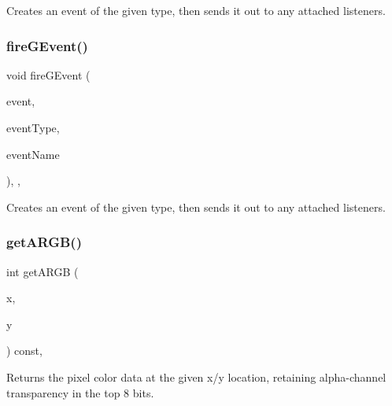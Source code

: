 Creates an event of the given type, then sends it out to any attached listeners. 

\mbox{\label{classsgl_1_1GObservable_a2a70a7d7435ff0c3b80bb4d70da19e0d}} 
\subsubsection{\texorpdfstring{fire\+G\+Event()}{fireGEvent()}\hspace{0.1cm}{\footnotesize\ttfamily [8/8]}}
{\footnotesize\ttfamily void fire\+G\+Event (\begin{DoxyParamCaption}\item[{Q\+Window\+State\+Change\+Event $\ast$}]{event,  }\item[{\mbox{\hyperlink{namespacesgl_a2628ea8d12e8b2563c32f05dc7fff6fa}{Event\+Type}}}]{event\+Type,  }\item[{const std\+::string \&}]{event\+Name }\end{DoxyParamCaption})\hspace{0.3cm}{\ttfamily [protected]}, {\ttfamily [virtual]}, {\ttfamily [inherited]}}



Creates an event of the given type, then sends it out to any attached listeners. 

\mbox{\label{classsgl_1_1GDrawingSurface_ae394d39f20476570e083918d991c25bd}} 
\subsubsection{\texorpdfstring{get\+A\+R\+G\+B()}{getARGB()}}
{\footnotesize\ttfamily int get\+A\+R\+GB (\begin{DoxyParamCaption}\item[{double}]{x,  }\item[{double}]{y }\end{DoxyParamCaption}) const\hspace{0.3cm}{\ttfamily [virtual]}, {\ttfamily [inherited]}}



Returns the pixel color data at the given x/y location, retaining alpha-\/channel transparency in the top 8 bits. 

